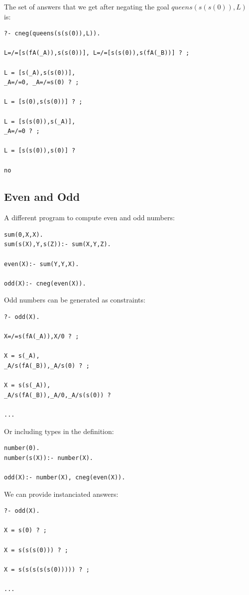 \documentclass{tlp}
\begin{document}
The set of answers that we get after negating the goal $queens(s(s(0)),L)$ is:
\begin{small}
\begin{verbatim}
?- cneg(queens(s(s(0)),L)).

L=/=[s(fA(_A)),s(s(0))], L=/=[s(s(0)),s(fA(_B))] ? ;

L = [s(_A),s(s(0))],
_A=/=0, _A=/=s(0) ? ;

L = [s(0),s(s(0))] ? ;

L = [s(s(0)),s(_A)],
_A=/=0 ? ;

L = [s(s(0)),s(0)] ? 

no
\end{verbatim}
\end{small}
\subsection*{Even and Odd}

A different program to compute even and odd numbers:
\begin{small}
\begin{verbatim}
sum(0,X,X).
sum(s(X),Y,s(Z)):- sum(X,Y,Z).

even(X):- sum(Y,Y,X).

odd(X):- cneg(even(X)).
\end{verbatim}
\end{small}

Odd numbers can be generated as constraints:
\begin{small}
\begin{verbatim}
?- odd(X).

X=/=s(fA(_A)),X/0 ? ;

X = s(_A),
_A/s(fA(_B)),_A/s(0) ? ;

X = s(s(_A)),
_A/s(fA(_B)),_A/0,_A/s(s(0)) ? 

...
\end{verbatim}
\end{small}

Or including types in the definition:
\begin{small}
\begin{verbatim}
number(0).
number(s(X)):- number(X).

odd(X):- number(X), cneg(even(X)).
\end{verbatim}
\end{small}

We can provide instanciated answers:
\begin{small}
\begin{verbatim}
?- odd(X).

X = s(0) ? ;

X = s(s(s(0))) ? ;

X = s(s(s(s(s(0))))) ? ;

...
\end{verbatim}
\end{small}
\end{document}
